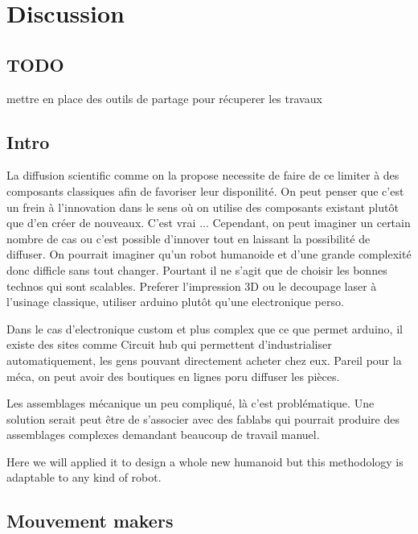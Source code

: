 
\chapter{Discussion} %


\section{TODO} %

mettre en place des outils de partage pour récuperer les travaux



\section{Intro} %
La diffusion scientific comme on la propose necessite de faire de ce limiter à des composants classiques afin de favoriser leur disponilité. On peut penser que c'est un frein à l'innovation dans le sens où on utilise des composants existant plutôt que d'en créer de nouveaux. C'est vrai ...
Cependant, on peut imaginer un certain nombre de cas ou c'est possible d'innover tout en laissant la possibilité de diffuser. On pourrait imaginer qu'un robot humanoide et d'une grande complexité donc difficle sans tout changer. Pourtant il ne s'agit que de choisir les bonnes technos qui sont scalables. Preferer l'impression 3D ou le decoupage laser à l'usinage classique, utiliser arduino plutôt qu'une electronique perso.

Dans le cas d'electronique custom et plus complex que ce que permet arduino, il existe des sites comme Circuit hub qui permettent d'industrialiser automatiquement, les gens pouvant directement acheter chez eux. Pareil pour la méca, on peut avoir des boutiques en lignes poru diffuser les pièces.

Les assemblages mécanique un peu compliqué, là c'est problématique. Une solution serait peut être de s'associer avec des fablabs qui pourrait produire des assemblages complexes demandant beaucoup de travail manuel.



Here we will applied it to design a whole new humanoid but this methodology is adaptable to any kind of robot.

\section{Mouvement makers} %

